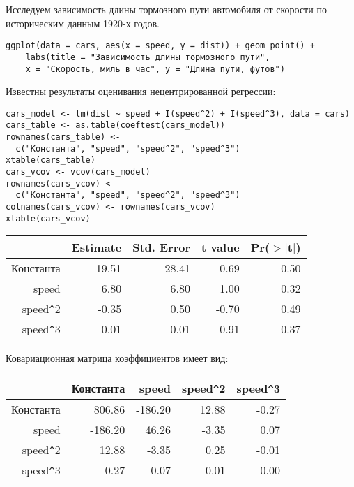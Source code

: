 \begin{problem}
Исследуем зависимость длины тормозного пути автомобиля от скорости по историческим данным 1920-х годов.

\begin{verbatim}
ggplot(data = cars, aes(x = speed, y = dist)) + geom_point() +
    labs(title = "Зависимость длины тормозного пути",
    x = "Скорость, миль в час", y = "Длина пути, футов")
\end{verbatim}


\begin{minipage}{0.6\textwidth}
\begin{center}
\begin{tikzpicture}[scale = 0.025]

\end{tikzpicture}
\end{center}
\end{minipage}



Известны результаты оценивания нецентрированной регрессии:

\begin{verbatim}
cars_model <- lm(dist ~ speed + I(speed^2) + I(speed^3), data = cars)
cars_table <- as.table(coeftest(cars_model))
rownames(cars_table) <-
  c("Константа", "speed", "speed^2", "speed^3")
xtable(cars_table)
cars_vcov <- vcov(cars_model)
rownames(cars_vcov) <-
  c("Константа", "speed", "speed^2", "speed^3")
colnames(cars_vcov) <- rownames(cars_vcov)
xtable(cars_vcov)
\end{verbatim}



\begin{tabular}{rrrrr}
  \hline
 & Estimate & Std. Error & t value & Pr($>$$|$t$|$) \\ 
  \hline
Константа & -19.51 & 28.41 & -0.69 & 0.50 \\ 
  speed & 6.80 & 6.80 & 1.00 & 0.32 \\ 
  speed\verb|^|2 & -0.35 & 0.50 & -0.70 & 0.49 \\ 
  speed\verb|^|3 & 0.01 & 0.01 & 0.91 & 0.37 \\ 
   \hline
\end{tabular}


Ковариационная матрица коэффициентов имеет вид:

\begin{tabular}{rrrrr}
  \hline
 & Константа & speed & speed\verb|^|2 & speed\verb|^|3 \\ 
  \hline
Константа & 806.86 & -186.20 & 12.88 & -0.27 \\ 
  speed & -186.20 & 46.26 & -3.35 & 0.07 \\ 
  speed\verb|^|2 & 12.88 & -3.35 & 0.25 & -0.01 \\ 
  speed\verb|^|3 & -0.27 & 0.07 & -0.01 & 0.00 \\ 
   \hline
\end{tabular}



\end{problem}
